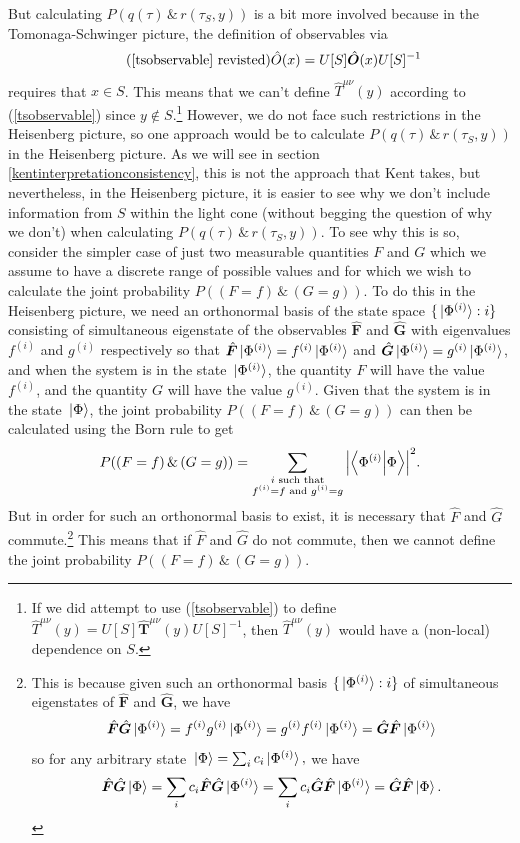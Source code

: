  But calculating $P(q(\tau) \, \&\,  r(\tau_S,y))$ is a bit more involved because in the Tomonaga-Schwinger picture, the definition of observables via 
 \begin{equation}\tag{\ref{tsobservable} revisted}
  \hat{O}(x)=U[S]\hat{\bm{O}}(x)U[S]^{-1}
\end{equation}
requires that $x\in S$.
This means that we can't define $\hat{T}^{\mu\nu}(y)$ according to (\ref{tsobservable}) since $y\not\in S$.\footnote{If we did attempt to use (\ref{tsobservable}) to define $\hat{T}^{\mu\nu}(y)=U[S]\hat{\bm{T}}^{{\mu\nu}}(y)U[S]^{-1}$, then $\hat{T}^{\mu\nu}(y)$ would have a (non-local) dependence on $S$.} However, we do not face such restrictions in the Heisenberg picture, so one approach would be to calculate $P(q(\tau) \, \&\,  r(\tau_S,y))$ in the Heisenberg picture. As we will see in section \ref{kentinterpretationconsistency}, this is not the approach that Kent takes, but nevertheless, in the Heisenberg picture, it is easier to see why we don't include information from $S$ within the light cone (without begging the question of why we don't) when calculating $P(q(\tau) \, \&\,  r(\tau_S,y))$. To see why this is so, consider the simpler case of just two measurable quantities ${F}$ and ${G}$ which we assume to have a discrete range of possible values and for which we wish to calculate the joint probability $P((F=f)\, \&\, (G=g))$. To do this in the Heisenberg picture, we need an orthonormal basis of the state space $\{\ket*{\Phi^{(i)}}:i\}$ consisting of simultaneous eigenstate of the observables $\hat{\bm{F}}$ and $\hat{\bm{G}}$ with eigenvalues $f^{(i)}$ and $g^{(i)}$ respectively so that $\hat{\bm{F}}\ket*{\Phi^{(i)}}=f^{(i)}\ket*{\Phi^{(i)}}$ and $\hat{\bm{G}}\ket*{\Phi^{(i)}}=g^{(i)}\ket*{\Phi^{(i)}}$, and when the system is in the state $\ket*{\Phi^{(i)}}$, the quantity $F$ will have the value $f^{(i)}$, and the quantity $G$ will have the value $g^{(i)}$. Given that the system is in the state $\ket*{\Phi}$, the joint probability $P((F=f)\, \&\, (G=g))$ can then be calculated using the Born rule to get
$$P((F=f)\, \&\, (G=g))=\sum_{\substack{i \text{ such that} \\ f^{(i)}=f \text{ and } g^{(i)}=g}}\abs{\ip{\Phi^{(i)}}{\Phi}}^2.$$
But  in order for such an orthonormal basis to exist, it is necessary that $\hat{F}$ and $\hat{G}$ commute.\footnote{This is because given such an orthonormal basis $\{\ket*{\Phi^{(i)}}:i\}$ of simultaneous eigenstates of $\hat{\bm{F}}$ and $\hat{\bm{G}}$, we have 
$$\hat{\bm{F}}\hat{\bm{G}}\ket*{\Phi^{(i)}}=f^{(i)}g^{(i)}\ket*{\Phi^{(i)}}=g^{(i)}f^{(i)}\ket*{\Phi^{(i)}}=\hat{\bm{G}}\hat{\bm{F}}\ket*{\Phi^{(i)}}$$ so for any arbitrary state $\ket*{\Phi}=\sum_i c_i \ket*{\Phi^{(i)}},$ we have 
$$\hat{\bm{F}}\hat{\bm{G}}\ket*{\Phi}=\sum_i c_i \hat{\bm{F}}\hat{\bm{G}}\ket*{\Phi^{(i)}}= \sum_i c_i \hat{\bm{G}}\hat{\bm{F}}\ket*{\Phi^{(i)}}=\hat{\bm{G}}\hat{\bm{F}}\ket*{\Phi}.$$ 
} This means that if $\hat{F}$ and $\hat{G}$ do not commute, then we cannot define the joint probability $P((F=f)\, \&\, (G=g)).$

